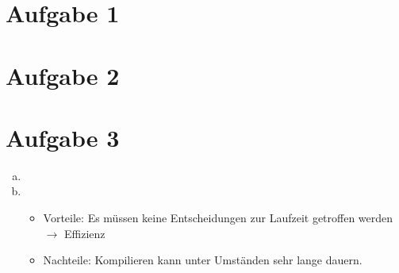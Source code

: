 \documentclass{article}
\begin{document}
    \section*{Aufgabe 1}
    
    \section*{Aufgabe 2}
    
    \section*{Aufgabe 3}
    \begin{enumerate}[(a)]
        \item 
        \item \begin{itemize}
            \item Vorteile: Es müssen keine Entscheidungen zur Laufzeit getroffen werden $\to$ Effizienz
            \item Nachteile: Kompilieren kann unter Umständen sehr lange dauern.
            \end{itemize}
    \end{enumerate}
    
\end{document}
